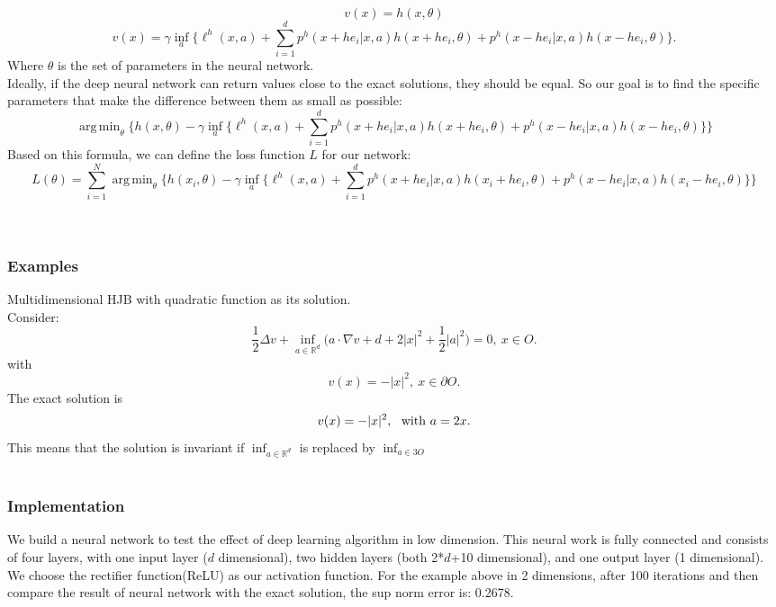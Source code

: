 \documentclass[11pt]{amsart}
\DeclareMathOperator*{\argminA}{arg\,min} %
\begin{document}
$$
v(x) = h(x,\theta)
$$
$$
v(x)  = \gamma \inf_{a} 
\Big\{ \ell^{h}(x, a) + 
\sum_{i=1}^{d} 
p^{h}(x+he_{i}|x, a) h(x+he_{i} ,\theta)
+ p^{h}(x-he_{i}|x, a) h(x-he_{i} ,\theta)
\Big\}. 
$$
Where $\theta$ is the set of parameters in the neural network.\\
Ideally, if the deep neural network can return values close to the exact solutions, they should be equal. So our goal is to find the specific parameters that make the difference between them as small as possible:
$$
\argminA_\theta\Big \{h(x,\theta) - \gamma \inf_{a} 
\Big\{ \ell^{h}(x, a) + 
\sum_{i=1}^{d} 
p^{h}(x+he_{i}|x, a) h(x+he_{i} ,\theta)
+ p^{h}(x-he_{i}|x, a) h(x-he_{i} ,\theta)\Big\}\Big\}
$$
Based on this formula, we can define the loss function $L$ for our network:
$$
L(\theta) = \sum_{i=1}^{N} {\argminA_\theta\Big \{h(x_i,\theta) - \gamma \inf_{a} 
\Big\{ \ell^{h}(x, a) + 
\sum_{i=1}^{d} 
p^{h}(x+he_{i}|x, a) h(x_i+he_{i} ,\theta)
+ p^{h}(x-he_{i}|x, a) h(x_i-he_{i} ,\theta)\Big\}\Big\}}
$$
\\ \hspace*{\fill} \\
\subsubsection{Examples} 
Multidimensional HJB with quadratic function as its solution.\\
Consider:
$$
 \frac 1 2 \Delta v + \inf_{a\in \mathbb R^{d}}
 \Big(a \cdot \nabla v +d + 2|x|^2 + \frac 1 2 |a| ^2 \Big) = 0, \ x\in O.
$$
with
$$
v(x) = -|x|^2, \ x\in \partial O.
$$
The exact solution is 
$$
v(x) =  -|x|^2, \ \hbox{ with } a= 2x.
$$
This means that the solution is invariant if $\inf_{a\in \mathbb R^{d}}$ is
replaced by $\inf_{a\in 3 O}$
\\ \hspace*{\fill} \\
\subsubsection{Implementation} We build a neural network to test the effect of deep learning algorithm in low dimension. This neural work is fully connected and consists of four layers, with one input layer ($d$ dimensional), two hidden layers (both 2*$d$+10 dimensional), and one output layer (1 dimensional). We choose the rectifier function(ReLU) as our activation function. For the example above in 2 dimensions, after 100 iterations and then compare the result of neural network with the exact solution, the sup norm error is: 0.2678.
\end{document}
